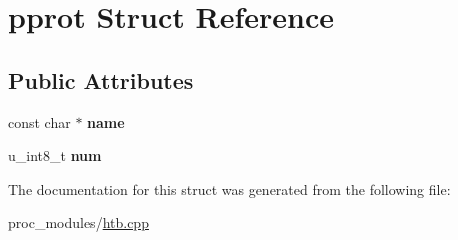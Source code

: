 \hypertarget{structpprot}{}\section{pprot Struct Reference}
\label{structpprot}
\subsection*{Public Attributes}
\begin{DoxyCompactItemize}
\item 
\mbox{\label{structpprot_a83158e600d1d1e694818b1d1e5251896}} 
const char $\ast$ {\bfseries name}
\item 
\mbox{\label{structpprot_af0912e98c2c23259d2c7638f85be80d4}} 
u\+\_\+int8\+\_\+t {\bfseries num}
\end{DoxyCompactItemize}


The documentation for this struct was generated from the following file\+:\begin{DoxyCompactItemize}
\item 
proc\+\_\+modules/\hyperlink{htb_8cpp}{htb.\+cpp}\end{DoxyCompactItemize}

